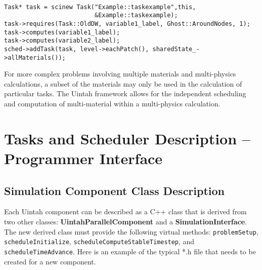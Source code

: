 \documentclass[12pt]{report}
\begin{document}
\begin{verbatim}

Task* task = scinew Task("Example::taskexample",this,
                         &Example::taskexample);
task->requires(Task::OldDW, variable1_label, Ghost::AroundNodes, 1);
task->computes(variable1_label);
task->computes(variable2_label);
sched->addTask(task, level->eachPatch(), sharedState_->allMaterials());

\end{verbatim}

For more complex problems involving multiple materials and
multi-physics calculations, a subset of the materials may only be used
in the calculation of particular tasks.  The Uintah framework allows
for the independent scheduling and computation of multi-material
within a multi-physics calculation.

\section{Tasks and Scheduler Description -- Programmer Interface}

\subsection{Simulation Component Class Description}

Each Uintah component can be described as a C++ class that is derived
from two other classes: \textbf{UintahParallelComponent} and a
\textbf{SimulationInterface}. The new derived class must provide the
following virtual methods: \texttt{problemSetup},
\texttt{scheduleInitialize}, \texttt{scheduleComputeStableTimestep},
and \texttt{scheduleTimeAdvance}.  Here is an example of the typical
*.h file that needs to be created for a new component.
\end{document}

